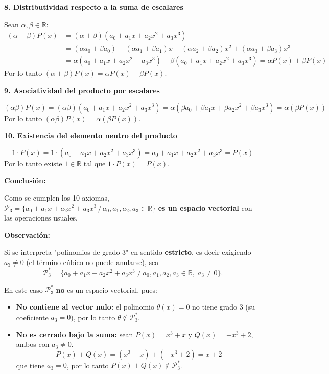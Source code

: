\documentclass[12pt]{article}
\begin{document}
\begin{enumerate}[label=\alph*.-]
    \textbf{8. Distributividad respecto a la suma de escalares}

    Sean $\alpha,\beta \in \mathbb{R}$:
    \begin{align*}
    (\alpha+\beta)P(x) &= (\alpha+\beta)(a_0+a_1x+a_2x^2+a_3x^3)\\
    &= (\alpha a_0+\beta a_0)+(\alpha a_1+\beta a_1)x+(\alpha a_2+\beta a_2)x^2+(\alpha a_3+\beta a_3)x^3\\
    &= \alpha(a_0+a_1x+a_2x^2+a_3x^3)+\beta(a_0+a_1x+a_2x^2+a_3x^3) = \alpha P(x)+\beta P(x)
    \end{align*}
    Por lo tanto $(\alpha+\beta)P(x)=\alpha P(x)+\beta P(x)$.

    \textbf{9. Asociatividad del producto por escalares}

    \[
    (\alpha\beta)P(x) = (\alpha\beta)(a_0+a_1x+a_2x^2+a_3x^3) = \alpha(\beta a_0+\beta a_1x+\beta a_2x^2+\beta a_3x^3) = \alpha(\beta P(x))
    \]
    Por lo tanto $(\alpha\beta)P(x)=\alpha(\beta P(x))$.

    \textbf{10. Existencia del elemento neutro del producto}

    \[
    1\cdot P(x) = 1\cdot(a_0+a_1x+a_2x^2+a_3x^3) = a_0+a_1x+a_2x^2+a_3x^3 = P(x)
    \]
    Por lo tanto existe $1\in\mathbb{R}$ tal que $1\cdot P(x)=P(x)$.

    \textbf{Conclusión:}

    Como se cumplen los 10 axiomas, $\mathcal{P}_3=\{a_0+a_1x+a_2x^2+a_3x^3 \, / \, a_0,a_1,a_2,a_3\in\mathbb{R}\}$ \textbf{es un espacio vectorial} con las operaciones usuales.

    \textbf{Observación:}

    Si se interpreta "polinomios de grado 3" en sentido \textbf{estricto}, es decir exigiendo $a_3\neq 0$ (el término cúbico no puede anularse), sea
    \[
    \mathcal{P}_3^{*} = \{a_0+a_1x+a_2x^2+a_3x^3 \; / \; a_0,a_1,a_2,a_3\in\mathbb{R},\; a_3\neq 0\}.
    \]

    En este caso $\mathcal{P}_3^{*}$ \textbf{no} es un espacio vectorial, pues:

    \begin{itemize}
        \item \textbf{No contiene al vector nulo:} el polinomio $\theta(x)=0$ no tiene grado 3 (su coeficiente $a_3=0$), por lo tanto $\theta \notin \mathcal{P}_3^{*}$.
        \item \textbf{No es cerrado bajo la suma:} sean $P(x)=x^3+x$ y $Q(x)=-x^3+2$, ambos con $a_3\neq 0$.
        \[
        P(x)+Q(x) = (x^3+x)+(-x^3+2) = x+2
        \]
        que tiene $a_3=0$, por lo tanto $P(x)+Q(x) \notin \mathcal{P}_3^{*}$.
    \end{itemize}


\end{enumerate}
\end{document}
